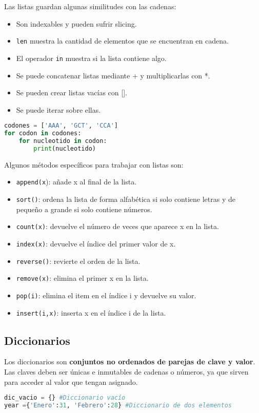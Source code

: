Las listas guardan algunas similitudes con las cadenas: \begin{itemize}
\item Son indexables y pueden sufrir slicing.
\item \texttt{len} muestra la cantidad de elementos que se encuentran en cadena.
\item El operador \texttt{in} muestra si la lista contiene algo.
\item Se puede concatenar listas mediante + y multiplicarlas con *.
\item Se pueden crear listas vacías con [].
\item Se puede iterar sobre ellas.
\end{itemize}
\begin{lstlisting}[language=Python]
codones = ['AAA', 'GCT', 'CCA']
for codon in codones:
	for nucleotido in codon:
		print(nucleotido)
\end{lstlisting}

Algunos métodos específicos para trabajar con listas son:
\begin{itemize}
\item \texttt{append(x}): añade x al final de la lista.
\item\texttt{sort()}: ordena la lista de forma alfabética si solo contiene letras y de pequeño a grande si solo contiene números. 
\item \texttt{count(x)}: devuelve el número de veces que aparece x en la lista.
\item \texttt{index(x)}: devuelve el índice del primer valor de x.
\item \texttt{reverse()}: revierte el orden de la lista.
\item \texttt{remove(x)}: elimina el primer x en la lista.
\item \texttt{pop(i)}: elimina el item en el índice i y devuelve su valor.
\item \texttt{insert(i,x)}: inserta x en el índice i de la lista.
\end{itemize}

\subsection{Diccionarios}
Los diccionarios son \textbf{conjuntos no ordenados de parejas de clave y valor}. Las claves deben ser únicas e inmutables de cadenas o números, ya que sirven para acceder al valor que tengan asignado. 
\begin{lstlisting}[language=Python]
dic_vacio = {} #Diccionario vacío
year ={'Enero':31, 'Febrero':28} #Diccionario de dos elementos
\end{lstlisting}

